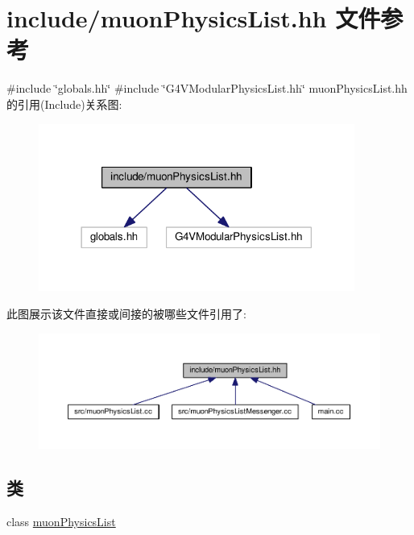 \hypertarget{muonPhysicsList_8hh}{}\section{include/muon\+Physics\+List.hh 文件参考}
\label{muonPhysicsList_8hh}
{\ttfamily \#include \char`\"{}globals.\+hh\char`\"{}}\newline
{\ttfamily \#include \char`\"{}G4\+V\+Modular\+Physics\+List.\+hh\char`\"{}}\newline
muon\+Physics\+List.\+hh 的引用(Include)关系图\+:\nopagebreak
\begin{figure}[H]
\begin{center}
\leavevmode
\includegraphics[width=294pt]{muonPhysicsList_8hh__incl}
\end{center}
\end{figure}
此图展示该文件直接或间接的被哪些文件引用了\+:\nopagebreak
\begin{figure}[H]
\begin{center}
\leavevmode
\includegraphics[width=350pt]{muonPhysicsList_8hh__dep__incl}
\end{center}
\end{figure}
\subsection*{类}
\begin{DoxyCompactItemize}
\item 
class \hyperlink{classmuonPhysicsList}{muon\+Physics\+List}
\end{DoxyCompactItemize}
